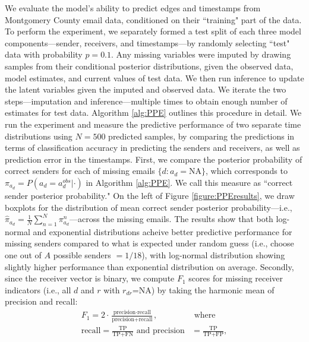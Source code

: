 \documentclass[ba]{imsart}
\numberwithin{equation}{section}
\theoremstyle{plain}
\begin{document}
	We evaluate the model's ability to predict edges and timestamps from Montgomery County email data, conditioned on their ``training" part of the data. To perform the experiment, we separately formed a test split of each three model components---sender, receivers, and timestamps---by randomly selecting ``test" data with probability $p=0.1$. Any missing variables were imputed by drawing samples from their conditional posterior distributions, given the observed data, model estimates, and current values of test data. We then run inference to update the latent variables given the imputed and observed data. We iterate the two steps---imputation and inference---multiple times to obtain enough number of estimates for test data. Algorithm \ref{alg:PPE} outlines this procedure in detail. We run the experiment and measure the predictive performance of two separate time distributions using $N=500$ predicted samples, by comparing the predictions in terms of classification accuracy in predicting the senders and receivers, as well as prediction error in the timestamps. First, we compare the posterior probability of correct senders for each of missing emails $\{d:a_d=\mbox{NA}\}$, which corresponds to $\pi_{a_{d}}=P(a_{d} = a^{obs}_{d}|\cdot)$ in Algorithm \ref{alg:PPE}. We call this measure as ``correct sender posterior probability." On the left of Figure \ref{figure:PPEresults}, we draw boxplots for the distribution of mean correct sender posterior probability---i.e., $\hat{\pi}_{a_{d}} = \frac{1}{N}\sum_{n=1}^N \pi^n_{a_{d}}$---across the missing emails. The results show that both log-normal and exponential distributions acheive better predictive performance for missing senders compared to what is expected under random guess (i.e., choose one out of $A$ possible senders $=1/18$), with log-normal distribution showing slightly higher performance than exponential distribution on average. Secondly, since the receiver vector is binary, we compute $F_1$ scores for missing receiver indicators (i.e., all $d$ and $r$ with $r_{dr}$=NA) by taking the harmonic mean of precision and recall:
	\begin{equation}
	\begin{aligned}
	F_1 =2\cdot\frac{\mbox{precision}\cdot \mbox{recall}}{\mbox{precision}+ \mbox{recall}}, &\mbox{ where } \\
			\mbox{recall}  = \frac{\mbox{TP}}{\mbox{TP+FN}} \mbox{ and } \mbox{precision} & =\frac{\mbox{TP}}{\mbox{TP+FP}},
			\end{aligned}
	\end{equation}
\end{document}
